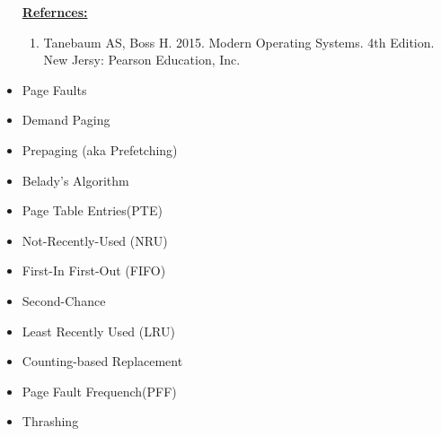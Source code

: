 \documentclass[12pt]{article}
\begin{document}
\begin{itemize}
    \bigskip

    \underline{\textbf{Refernces:}}

    \bigskip

    \begin{enumerate}[1)]
        \item Tanebaum AS, Boss H. 2015. Modern Operating Systems. 4th Edition. New Jersy: Pearson Education, Inc.
    \end{enumerate}
    \item Page Faults
    \item Demand Paging
    \item Prepaging (aka Prefetching)
    \item Belady's Algorithm
    \item Page Table Entries(PTE)
    \item Not-Recently-Used (NRU)
    \item First-In First-Out (FIFO)
    \item Second-Chance
    \item Least Recently Used (LRU)
    \item Counting-based Replacement
    \item Page Fault Frequench(PFF)
    \item Thrashing
\end{itemize}
\end{document}
